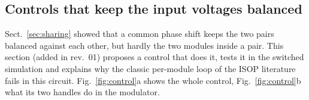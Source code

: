 \documentclass[10pt,a4paper]{scrartcl}
\begin{document}
\begin{onehalfspace}
\section{Controls that keep the input voltages balanced}
\label{sec:control}

Sect.~\ref{sec:sharing} showed that a common phase shift keeps the two pairs balanced against each other, but hardly the two modules inside a pair. This section (added in rev.~01) proposes a control that does it, tests it in the switched simulation and explains why the classic per-module loop of the ISOP literature fails in this circuit. Fig.~\ref{fig:control}a shows the whole control, Fig.~\ref{fig:control}b what its two handles do in the modulator.


\end{onehalfspace}
\end{document}
